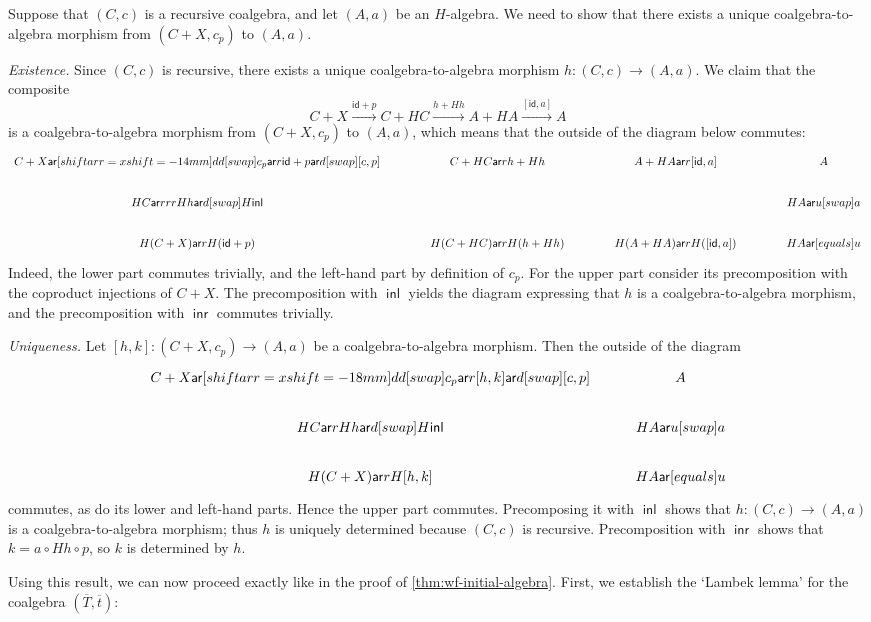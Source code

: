 \documentclass[10pt,a4paper]{article}
\makeatletter
\theoremstyle{definition}
\theoremstyle{remark}
\numberwithin{equation}{section}
\providecommand{\oname}[1]{{\mathop{\mathsf{#1}}\xspace}}
\providecommand{\id}{\mathsf{id}}
\providecommand{\xto}[1]{\,\xrightarrow{#1}\,}
\providecommand{\inl}{\oname{inl}}
\providecommand{\inr}{\oname{inr}}
\newcommand{\ar}{\mathsf{ar}}
\newcommand{\ol}{\overline}
\renewcommand{\id}{{\mathsf{id}}}
\renewcommand{\c}{\colon}
\newcommand{\xra}{\xrightarrow}
\renewcommand{\xto}{\xra}
\let\oldqedhere\qedhere
\def\qedhere{\global\def\proofappendix@qedsymbolmissing{}\oldqedhere}
\newenvironment{proofhere}[2][Proof of]{    \proof{#1~\autoref{#2}}    }{  \endproof  \par}
\newenvironment{proofappendix}[2][Proof of]{    \begin{proofhere}[#1]{#2}\label{#2:proof}
  }{    \end{proofhere}
  }
\theoremstyle{plain}
\theoremstyle{definition}
\makeatother
\begin{document}
\begin{proofappendix}{prop:rec-coalgebra-coproduct}
Suppose that $(C,c)$ is a recursive coalgebra, and let $(A,a)$ be an $H$-algebra. We need to show that there exists a unique coalgebra-to-algebra morphism from $(C+X,c_p)$ to $(A,a)$.

\medskip\noindent\emph{Existence.} Since $(C,c)$ is recursive, there exists a unique coalgebra-to-algebra morphism $h\colon (C,c)\to (A,a)$. We claim that the composite
\[ C+X \xto{\id+p} C+HC \xto{h+Hh} A+HA \xto{[\id,a]} A \]
is a coalgebra-to-algebra morphism from $(C+X, c_p)$ to $(A,a)$, which means that the outside of the diagram below commutes:
\[
\begin{tikzcd}[column sep=35]
C+X \ar[shiftarr={xshift=-14mm}]{dd}[swap]{c_p} \ar{r}{\id+p} \ar{d}[swap]{[c,p]} & C+HC \ar{r}{h+Hh} & A+HA \ar{r}{[\id,a]} & A \\
HC \ar{rrr}{Hh} \ar{d}[swap]{H\inl} & & & HA \ar{u}[swap]{a} \\
H(C+X) \ar{r}{H(\id+p)} & H(C+HC) \ar{r}{H(h+Hh)} & H(A+HA) \ar{r}{H([\id,a])} & HA \ar[equals]{u}
\end{tikzcd}
\]
Indeed, the lower part commutes trivially, and the left-hand part by definition of $c_p$. For the upper part consider its precomposition with the coproduct injections of $C+X$. The precomposition with $\inl$ yields the diagram expressing that $h$ is a coalgebra-to-algebra morphism, and the precomposition with $\inr$ commutes trivially.

\medskip\noindent\emph{Uniqueness.} Let $[h,k]\colon (C+X,c_p)\to (A,a)$ be a coalgebra-to-algebra morphism. Then the outside of the diagram
\[
\begin{tikzcd}
C+X \ar[shiftarr={xshift=-18mm}]{dd}[swap]{c_p} \ar{r}{[h,k]} \ar{d}[swap]{[c,p]} & A \\
HC \ar{r}{Hh} \ar{d}[swap]{H\inl} & HA \ar{u}[swap]{a} \\
H(C+X) \ar{r}{H[h,k]} & HA \ar[equals]{u}
\end{tikzcd}
\]
commutes, as do its lower and left-hand parts. Hence the upper part commutes. Precomposing it with $\inl$ shows that $h\c (C,c)\to (A,a)$ is a coalgebra-to-algebra morphism; thus $h$ is uniquely determined because $(C,c)$ is recursive. Precomposition with $\inr$ shows that $k=a\circ Hh\circ p$, so $k$ is determined by $h$. \qedhere 
\end{proofappendix}
Using this result, we can now proceed exactly like in the proof of \autoref{thm:wf-initial-algebra}. First, we establish the `Lambek lemma' for the coalgebra $(\ol{T},\ol{t})$:
\end{document}
